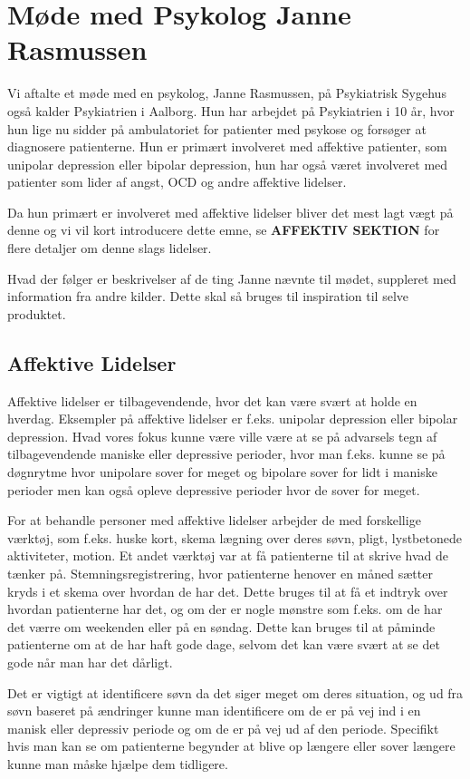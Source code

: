 \section{Møde med Psykolog Janne Rasmussen}
Vi aftalte et møde med en psykolog, Janne Rasmussen, på Psykiatrisk Sygehus også kalder Psykiatrien i Aalborg.
Hun har arbejdet på Psykiatrien i 10 år, hvor hun lige nu sidder på ambulatoriet for patienter med psykose og forsøger at diagnosere patienterne. 
Hun er primært involveret med affektive patienter, som unipolar depression eller bipolar depression, hun har også været involveret med patienter som lider af angst, OCD og andre affektive lidelser.

Da hun primært er involveret med affektive lidelser bliver det mest lagt vægt på denne og vi vil kort introducere dette emne, se \textbf{AFFEKTIV SEKTION} for flere detaljer om denne slags lidelser.

Hvad der følger er beskrivelser af de ting Janne nævnte til mødet, suppleret med information fra andre kilder. 
Dette skal så bruges til inspiration til selve produktet.

\subsection{Affektive Lidelser}
Affektive lidelser er tilbagevendende, hvor det kan være svært at holde en hverdag.
Eksempler på affektive lidelser er f.eks. unipolar depression eller bipolar depression.
Hvad vores fokus kunne være ville være at se på advarsels tegn af tilbagevendende maniske eller depressive perioder, hvor man f.eks. kunne se på døgnrytme hvor unipolare sover for meget og bipolare sover for lidt i maniske perioder men kan også opleve depressive perioder hvor de sover for meget.

For at behandle personer med affektive lidelser arbejder de med forskellige værktøj, som f.eks. huske kort, skema lægning over deres søvn, pligt, lystbetonede aktiviteter, motion. 
Et andet værktøj var at få patienterne til at skrive hvad de tænker på.
Stemningsregistrering, hvor patienterne henover en måned sætter kryds i et skema over hvordan de har det.
Dette bruges til at få et indtryk over hvordan patienterne har det, og om der er nogle mønstre som f.eks. om de har det værre om weekenden eller på en søndag.
Dette kan bruges til at påminde patienterne om at de har haft gode dage, selvom det kan være svært at se det gode når man har det dårligt. 

Det er vigtigt at identificere søvn da det siger meget om deres situation, og ud fra søvn baseret på ændringer kunne man identificere om de er på vej ind i en manisk eller depressiv periode og om de er på vej ud af den periode. 
Specifikt hvis man kan se om patienterne begynder at blive op længere eller sover længere kunne man måske hjælpe dem tidligere.

